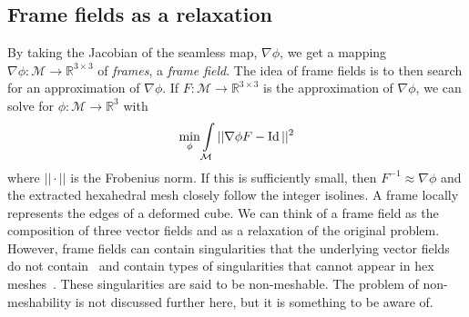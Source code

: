 \documentclass[../thesis.tex]{subfiles}
\begin{document}
\subsection{Frame fields as a relaxation}
By taking the Jacobian of the seamless map, $\nabla \phi$, we get a mapping
$\nabla \phi : \mathcal{M} \to \mathbb{R}^{3\times3}$ of \emph{frames}, a \emph{frame field}.
The idea of frame fields is to then search for an approximation of $\nabla \phi$.
If $F: \mathcal{M} \to \mathbb{R}^{3\times3}$ is the approximation of $\nabla \phi$, we can
solve for $\phi : \mathcal{M} \to \mathbb{R}^3$ with
\begin{equation}\label{eq:poisson}
  \min \limits_{\phi} \int \limits_{\mathcal{M}} ||\nabla \phi F - \Id||^2
\end{equation}
where $||\cdot||$ is the Frobenius norm. If this is sufficiently small, then $F^{-1} \approx \nabla \phi$ and 
the extracted hexahedral mesh closely follow the integer isolines.
A frame locally represents the edges of a deformed cube.
We can think of a frame field as the composition of three vector fields
and as a relaxation of the original problem. However, frame fields
can contain singularities that the underlying vector fields do not contain~\cite{Nieser}
and contain types of singularities that cannot appear in hex meshes~\cite{Liu}.
These singularities are said to be non-meshable.
The problem of non-meshability is not discussed further here, but it
is something to be aware of.
\end{document}
